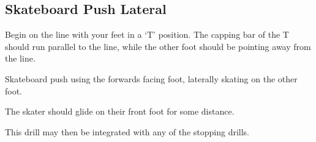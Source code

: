 \subsection*{Skateboard Push Lateral}

Begin on the line with your feet in a `T' position. The capping bar of the T should run parallel to the line, while the other foot should be pointing away from the line.     

Skateboard push using the forwards facing foot, laterally skating on the other foot.   

The skater should glide on their front foot for some distance.

This drill may then be integrated with any of the stopping drills.
